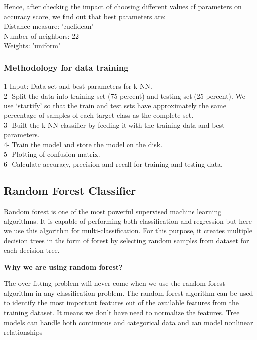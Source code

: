 Hence, after checking the impact of choosing different values of parameters on accuracy score, we find out that best parameters are:
\\
Distance measure: 'euclidean'\\
Number of neighbors: 22\\
Weights: 'uniform'\\


\subsubsection{Methodology for data training}

1-Input: Data set and best parameters for k-NN.\\
2- Split the data into training set (75 percent) and testing set (25 percent). We use ‘startify’ so that the train and test sets have approximately the same percentage of samples of each target class as the complete set.\\
3- Built the k-NN classifier by feeding it with the training data and best parameters.\\
4- Train the model and store the model on the disk.\\
5- Plotting of confusion matrix.\\
6- Calculate accuracy, precision and recall for training and testing data.\\



\subsection{Random Forest Classifier}
Random forest is one of the most powerful supervised machine learning algorithms. It is capable of performing both classification and regression but here we use this algorithm for multi-classification. For this purpose, it creates multiple decision trees in the form of forest by selecting random samples from dataset for each decision tree. 

\textbf{Why we are using random forest? }

The over fitting problem will never come when we use the random forest algorithm in any classification problem. The random forest algorithm can be used to identify the most important features out of the available features from the training dataset. It means we don’t have need to normalize the features. Tree models can handle both continuous and categorical data and can model nonlinear relationships

